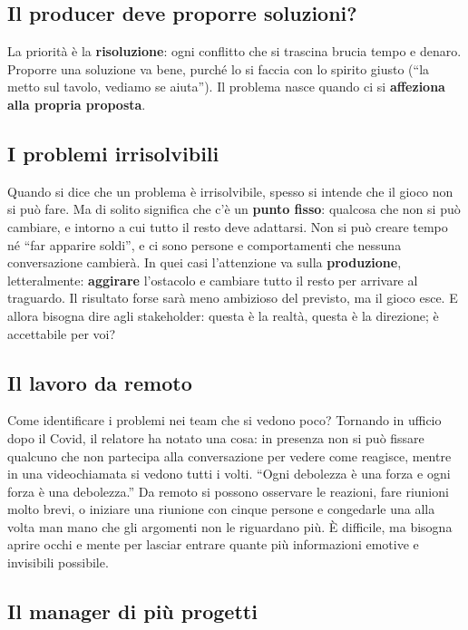 \subsection{Il producer deve proporre soluzioni?}

La priorità è la \textbf{risoluzione}: ogni conflitto che si trascina brucia tempo
e denaro. Proporre una soluzione va bene, purché lo si faccia con lo spirito giusto
(``la metto sul tavolo, vediamo se aiuta''). Il problema nasce quando ci si
\textbf{affeziona alla propria proposta}.

\subsection{I problemi irrisolvibili}

Quando si dice che un problema è irrisolvibile, spesso si intende che il gioco non
si può fare. Ma di solito significa che c'è un \textbf{punto fisso}: qualcosa che
non si può cambiare, e intorno a cui tutto il resto deve adattarsi. Non si può
creare tempo né ``far apparire soldi'', e ci sono persone e comportamenti che nessuna
conversazione cambierà. In quei casi l'attenzione va sulla
\textbf{produzione}, letteralmente: \textbf{aggirare} l'ostacolo e cambiare tutto il
resto per arrivare al traguardo. Il risultato forse sarà meno ambizioso del
previsto, ma il gioco esce. E allora bisogna dire agli stakeholder: questa è la
realtà, questa è la direzione; è accettabile per voi?

\subsection{Il lavoro da remoto}

Come identificare i problemi nei team che si vedono poco? Tornando in ufficio dopo il
Covid, il relatore ha notato una cosa: in presenza non si può fissare qualcuno che
non partecipa alla conversazione per vedere come reagisce, mentre in una
videochiamata si vedono tutti i volti. ``Ogni debolezza è una forza e ogni forza è
una debolezza.'' Da remoto si possono osservare le reazioni, fare riunioni molto
brevi, o iniziare una riunione con cinque persone e congedarle una alla volta man
mano che gli argomenti non le riguardano più. È difficile, ma bisogna aprire occhi
e mente per lasciar entrare quante più informazioni emotive e invisibili possibile.

\subsection{Il manager di più progetti}

